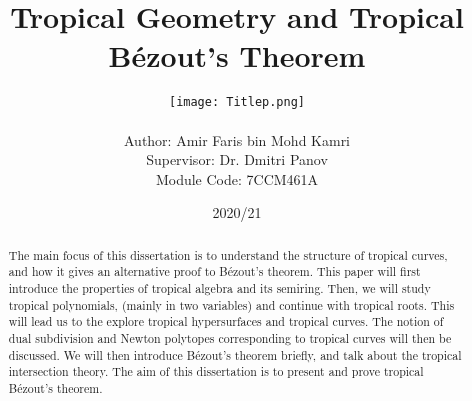 \documentclass[]{article}
\theoremstyle{definition}
\numberwithin{equation}{section}
\renewcommand{\.}{\,.}
\begin{document}
\begin{titlepage}

\title{\textbf{Tropical Geometry and Tropical B\'ezout's Theorem}}

\author{\texttt{[image: Titlep.png]} \\
	\\ Author: Amir Faris bin Mohd Kamri \\ Supervisor: Dr. Dmitri Panov \\ Module Code: 7CCM461A}
\date{2020/21} 
\clearpage\maketitle
\thispagestyle{empty}

\end{titlepage}
\newpage
\newpage

\begin{abstract}
The main focus of this dissertation is to understand the structure of tropical curves, and how it gives an alternative proof to B\'{e}zout's theorem. 
This paper will first introduce the properties of tropical algebra and its semiring. Then, we will study tropical polynomials, (mainly in two variables) and continue with tropical roots. This will lead us to the explore tropical hypersurfaces and tropical curves. The notion of dual subdivision and Newton polytopes corresponding to tropical curves will then be discussed. 
 We will then introduce B\'ezout's theorem briefly, and talk about the tropical intersection theory. The aim of this dissertation is to present and prove tropical B\'ezout's theorem. \end{abstract}

\newpage

\tableofcontents

\newpage

\newpage
\end{document}
